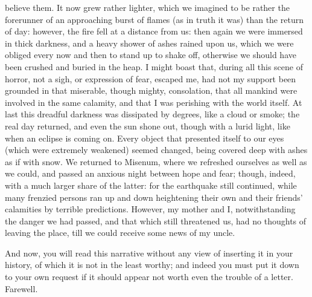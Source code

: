 believe them. It now grew rather lighter, which we imagined to be rather
the forerunner of an approaching burst of flames (as in truth it was) than
the return of day: however, the fire fell at a distance from us: then
again we were immersed in thick darkness, and a heavy shower of ashes
rained upon us, which we were obliged every now and then to stand up to
shake off, otherwise we should have been crushed and buried in the heap. I
might boast that, during all this scene of horror, not a sigh, or
expression of fear, escaped me, had not my support been grounded in that
miserable, though mighty, consolation, that all mankind were involved in
the same calamity, and that I was perishing with the world itself. At last
this dreadful darkness was dissipated by degrees, like a cloud or smoke;
the real day returned, and even the sun shone out, though with a lurid
light, like when an eclipse is coming on. Every object that presented
itself to our eyes (which were extremely weakened) seemed changed, being
covered deep with ashes as if with snow. We returned to Misenum, where we
refreshed ourselves as well as we could, and passed an anxious night
between hope and fear; though, indeed, with a much larger share of the
latter: for the earthquake still continued, while many frenzied persons
ran up and down heightening their own and their friends' calamities by
terrible predictions. However, my mother and I, notwithstanding the danger
we had passed, and that which still threatened us, had no thoughts of
leaving the place, till we could receive some news of my uncle.

And now, you will read this narrative without any view of inserting it in
your history, of which it is not in the least worthy; and indeed you must
put it down to your own request if it should appear not worth even the
trouble of a letter. Farewell.


